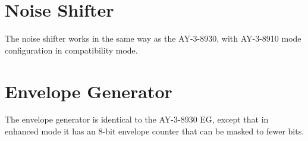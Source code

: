 \section{Noise Shifter}

The noise shifter works in the same way as the AY-3-8930, with AY-3-8910 mode configuration in compatibility mode.

\section{Envelope Generator}

The envelope generator is identical to the AY-3-8930 EG, except that in enhanced mode it has an 8-bit envelope counter that can be masked to fewer bits.